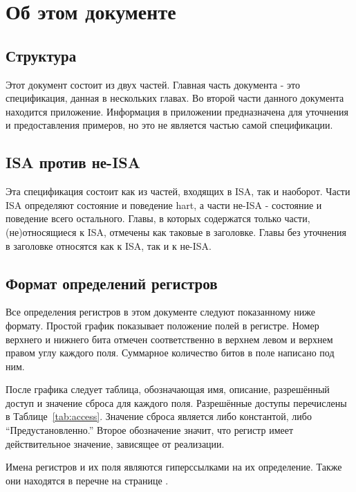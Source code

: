 \section{Об этом документе}

\subsection{Структура}

Этот документ состоит из двух частей. Главная часть документа - это
спецификация, данная в нескольких главах. Во второй части данного документа
находится приложение. Информация в приложении предназначена для уточнения
и предоставления примеров, но это не является частью самой спецификации.

\subsection{ISA против не-ISA}

Эта спецификация состоит как из частей, входящих в ISA, так и наоборот.
Части ISA определяют состояние и поведение hart, а части не-ISA - состояние и поведение
всего остального.
Главы, в которых содержатся только части, (не)относящиеся к ISA, отмечены как таковые
в заголовке. Главы без уточнения в заголовке относятся как к ISA, так и к не-ISA.

\subsection{Формат определений регистров}

Все определения регистров в этом документе следуют показанному ниже формату.
Простой график показывает положение полей в регистре. Номер верхнего и нижнего бита
отмечен соответственно в верхнем левом и верхнем правом углу каждого поля. Суммарное количество
битов в поле написано под ним.

После графика следует таблица, обозначающая имя, описание, разрешённый доступ и
значение сброса для каждого поля. Разрешённые доступы перечислены в Таблице~\ref{tab:access}.
Значение сброса является либо константой, либо ``Предустановленно.''
Второе обозначение значит, что регистр имеет действительное значение, зависящее
от реализации.

Имена регистров и их поля являются гиперссылками на их определение. Также они
находятся в перечне на странице \pageref{index}.



